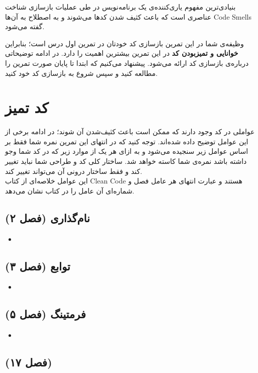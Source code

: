 \documentclass{utap}
\begin{document}
بنیادی‌ترین مفهوم یاری‌کننده‌ی یک برنامه‌نویس در طی عملیات بازسازی شناخت عناصری است که باعث کثیف شدن کدها می‌شوند و به اصطلاح به آن‌ها Code Smells گفته می‌شود.

وظیفه‌ی شما در این تمرین بازسازی کد خودتان در تمرین اول درس است؛ بنابراین \textbf{خوانایی و تمیزبودن کد} در این تمرین بیشترین اهمیت را دارد. در ادامه توضیحاتی درباره‌ی بازسازی کد اراﺋﻪ می‌شود. پیشنهاد می‌کنیم که ابتدا تا پایان صورت تمرین را مطالعه کنید و سپس شروع به بازسازی کد خود کنید.
\newpage
\section{کد تمیز}
عواملی در کد وجود دارند که ممکن است باعث کثیف‌شدن آن شوند؛ در ادامه برخی از این عوامل توضیح داده شده‌اند. توجه کنید که در انتهای این تمرین نمره شما فقط بر اساس عوامل زیر سنجیده می‌شود و به ازای هر یک از موارد زیر که در کد شما وجو داشته باشد نمره‌ی شما کاسته خواهد شد. ساختار کلی کد و طراحی شما نباید تغییر کند و فقط ساختار درونی آن می‌تواند تغییر کند.\\
این عوامل خلاصه‌ای از کتاب Clean Code هستند و عبارت انتهای هر عامل فصل و شماره‌ای آن عامل را در کتاب نشان می‌دهد.

\subsection{نام‌گذاری (فصل ۲)}
  \begin{itemize}
        \item
    \end{itemize}

\subsection{توابع (فصل ۳)}
  \begin{itemize}
        \item
    \end{itemize}

\subsection{فرمتینگ (فصل ۵)}
  \begin{itemize}
        \item 
    \end{itemize}


\subsection{ (فصل ۱۷)}
\end{document}
